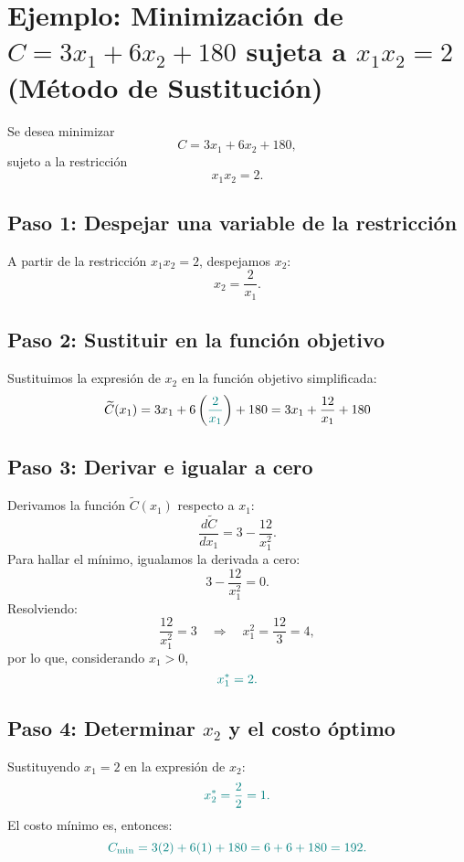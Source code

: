 \documentclass{article}
\begin{document}
\section*{Ejemplo: Minimización de \(C = 3x_1 + 6x_2 + 180\) sujeta a \(x_1 x_2 = 2\) (Método de Sustitución)}

Se desea minimizar
\[
C = 3x_1 + 6x_2 + 180,
\]
sujeto a la restricción
\[
x_1 x_2 = 2.
\]


\subsection*{Paso 1: Despejar una variable de la restricción}

A partir de la restricción \(x_1 x_2 = 2\), despejamos \(x_2\):
\[
x_2 = \frac{2}{x_1}.
\]

\subsection*{Paso 2: Sustituir en la función objetivo}

Sustituimos la expresión de \(x_2\) en la función objetivo simplificada:
\[
\widetilde{C}(x_1) = 3x_1 + 6\left({\color{teal}\frac{2}{x_1}}\right) +180 = 3x_1 + \frac{12}{x_1} +180
\]

\subsection*{Paso 3: Derivar e igualar a cero}

Derivamos la función \(\widetilde{C}(x_1)\) respecto a \(x_1\):
\[
\frac{d\widetilde{C}}{dx_1} = 3 - \frac{12}{x_1^2}.
\]
Para hallar el mínimo, igualamos la derivada a cero:
\[
3 - \frac{12}{x_1^2} = 0.
\]
Resolviendo:
\[
\frac{12}{x_1^2} = 3 \quad \Longrightarrow \quad x_1^2 = \frac{12}{3} = 4,
\]
por lo que, considerando \(x_1 > 0\),
\[\color{teal}
x_1^* = 2.
\]

\subsection*{Paso 4: Determinar \(x_2\) y el costo óptimo}

Sustituyendo \(x_1 = 2\) en la expresión de \(x_2\):
\[\color{teal}
x_2^* = \frac{2}{2} = 1.
\]
El costo mínimo es, entonces:
\[\color{teal}
C_{\min} = 3(2) + 6(1) + 180 = 6 + 6 + 180 = 192.
\]
\end{document}
